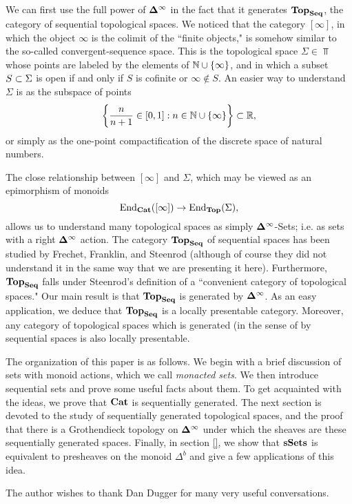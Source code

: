 \documentclass{amsart}
\def\Seq{{\bf Seq}}
\def\Del{{\bf \Delta}}
\def\Delinf{{\Del^\infty}}
\begin{document}

We can first use the full power of $\Delinf$ in the fact that it generates $\Top_\Seq$, the category of sequential topological spaces.  We noticed that the category $[\infty]$, in which the object $\infty$ is the colimit of the ``finite objects," is somehow similar to the so-called convergent-sequence space.  This is the topological space $\Sigma\in\Top$ whose points are labeled by the elements of $\NN\cup\{\infty\}$, and in which a subset $S\ss\Sigma$ is open if and only if $S$ is cofinite or $\infty\not\in S$.  An easier way to understand $\Sigma$ is as the subspace of points $$\left\{\frac{n}{n+1}\in [0,1]: n\in\NN\cup\{\infty\}\right\}\ss\RR,$$ or simply as the one-point compactification of the discrete space of natural numbers.

The close relationship between $[\infty]$ and $\Sigma$, which may be viewed as an epimorphism of monoids $$\End_\Cat([\infty])\to\End_\Top(\Sigma),$$ allows us to understand many topological spaces as simply $\Delinf$-Sets; i.e. as sets with a right $\Delinf$ action.  The category $\Top_\Seq$ of sequential spaces has been studied by Frechet, Franklin, and Steenrod (although of course they did not understand it in the same way that we are presenting it here).  Furthermore, $\Top_\Seq$ falls under Steenrod's definition of a ``convenient category of topological spaces."  Our main result is that $\Top_\Seq$ is generated by $\Delinf$.  As an easy application, we deduce that $\Top_\Seq$ is a locally presentable category.  Moreover, any category of topological spaces which is generated (in the sense of \cite{Dugger---} by sequential spaces is also locally presentable. 

The organization of this paper is as follows.  We begin with a brief discussion of sets with monoid actions, which we call {\em monacted sets}.  We then introduce sequential sets and prove some useful facts about them.  To get acquainted with the ideas, we prove that $\Cat$ is sequentially generated.  The next section is devoted to the study of sequentially generated topological spaces, and the proof that there is a Grothendieck topology on $\Delinf$ under which the sheaves are these sequentially generated spaces.  Finally, in section \ref{}, we show that $\sSets$ is equivalent to presheaves on the monoid $\Delta^b$ and give a few applications of this idea.

The author wishes to thank Dan Dugger for many very useful conversations.
\end{document}
